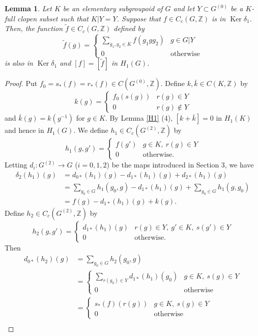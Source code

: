 \documentclass[11pt]{article}
\newtheorem{lem}[thm]{Lemma}
\theoremstyle{definition}
\renewcommand{\ker}{\operatorname{Ker}}
\newcommand{\Z}{\mathbb{Z}}
\begin{document}
\begin{lem}
Let $K$ be an elementary subgroupoid of $G$ and 
let $Y\subset G^{(0)}$ be a $K$-full clopen subset such that $K|Y=Y$. 
Suppose that $f\in C_c(G,\Z)$ is in $\ker\delta_1$. 
Then, the function $\tilde f\in C_c(G,\Z)$ defined by 
\[
\tilde f(g)
=\begin{cases}\sum_{g_1,g_2\in K}f(g_1gg_2) & g\in G|Y \\
0 & \text{otherwise}\end{cases}
\]
is also in $\ker\delta_1$ and $[f]=[\tilde f]$ in $H_1(G)$. 
\end{lem}
\begin{proof}
Put $f_0=s_*(f)=r_*(f)\in C(G^{(0)},\Z)$. 
Define $k,\bar{k}\in C(K,\Z)$ by 
\[
k(g)=\begin{cases}f_0(s(g)) & r(g)\in Y \\
0 & r(g)\notin Y\end{cases}
\]
and $\bar{k}(g)=k(g^{-1})$ for $g\in K$. 
By Lemma \ref{H1} (4), $[k+\bar{k}]=0$ in $H_1(K)$ 
and hence in $H_1(G)$. 
We define $h_1\in C_c(G^{(2)},\Z)$ by 
\[
h_1(g,g')=\begin{cases}f(g') & g\in K,\ r(g)\in Y\\
0 & \text{otherwise.}\end{cases}
\]
Letting $d_i:G^{(2)}\to G$ ($i=0,1,2$) be the maps introduced in Section 3, 
we have 
\begin{align*}
\delta_2(h_1)(g)
&=d_{0*}(h_1)(g)-d_{1*}(h_1)(g)+d_{2*}(h_1)(g) \\
&=\sum_{g_0\in G}h_1(g_0,g)-d_{1*}(h_1)(g)+\sum_{g_0\in G}h_1(g,g_0) \\
&=f(g)-d_{1*}(h_1)(g)+k(g). 
\end{align*}
Define $h_2\in C_c(G^{(2)},\Z)$ by 
\[
h_2(g,g')=\begin{cases}d_{1*}(h_1)(g) & r(g)\in Y,\ g'\in K,\ s(g')\in Y \\
0 & \text{otherwise.}\end{cases}
\]
Then 
\begin{align*}
d_{0*}(h_2)(g)
&=\sum_{g_0\in G}h_2(g_0,g) \\
&=\begin{cases}\sum_{r(g_0)\in Y}d_{1*}(h_1)(g_0) & g\in K,\ s(g)\in Y \\
0 & \text{otherwise}\end{cases} \\
&=\begin{cases}s_*(f)(r(g)) & g\in K,\ s(g)\in Y \\
0 & \text{otherwise}\end{cases} \\

\end{align*}
\end{proof}
\end{document}
